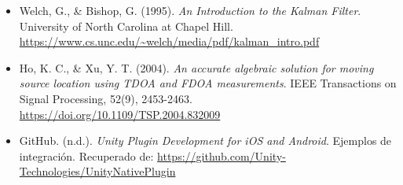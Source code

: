 \documentclass{article}
\begin{document}
\begin{itemize}
    \item Welch, G., \& Bishop, G. (1995). \textit{An Introduction to the Kalman Filter}. University of North Carolina at Chapel Hill. \url{https://www.cs.unc.edu/~welch/media/pdf/kalman_intro.pdf}
    
    \item Ho, K. C., \& Xu, Y. T. (2004). \textit{An accurate algebraic solution for moving source location using TDOA and FDOA measurements}. IEEE Transactions on Signal Processing, 52(9), 2453-2463. \url{https://doi.org/10.1109/TSP.2004.832009}
    
    \item GitHub. (n.d.). \textit{Unity Plugin Development for iOS and Android}. Ejemplos de integración. Recuperado de: \url{https://github.com/Unity-Technologies/UnityNativePlugin}
\end{itemize}
\end{document}
